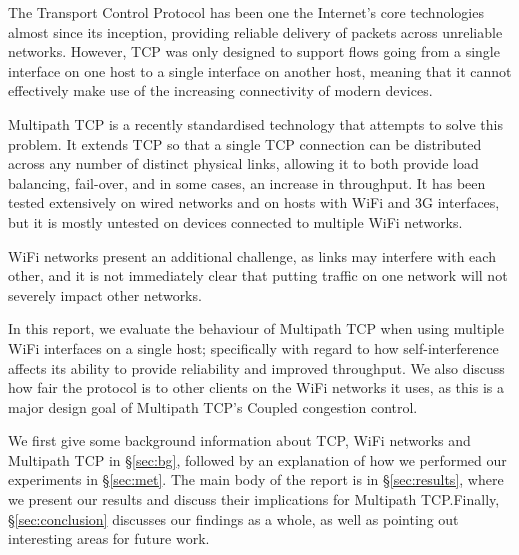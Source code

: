 The Transport Control Protocol has been one the Internet's core technologies almost since its inception, providing reliable delivery of packets across unreliable
networks. However, TCP was only designed to support flows going from a single
interface on one host to a single interface on another host, meaning that it cannot
effectively make use of the increasing connectivity of modern devices.

Multipath TCP is a recently standardised technology that attempts to solve this
problem. It extends TCP so that a single TCP connection can be distributed
across any number of distinct physical links, allowing it to both provide load
balancing, fail-over, and in some cases, an increase in throughput. It has been
tested extensively on wired networks and on hosts with WiFi and 3G interfaces,
but it is mostly untested on devices connected to multiple WiFi networks.

WiFi networks present an additional challenge, as links may interfere with each
other, and it is not immediately clear that putting traffic on one network will
not severely impact other networks.

In this report, we evaluate the behaviour of Multipath TCP when using multiple
WiFi interfaces on a single host; specifically with regard to how
self-interference affects its ability to provide reliability and improved
throughput. We also discuss how fair the protocol is to other clients on the WiFi
networks it uses, as this is a major design goal of Multipath TCP's Coupled
congestion control.

We first give some background information about TCP, WiFi networks and Multipath
TCP in \S\ref{sec:bg}, followed by an explanation of how we performed our
experiments in \S\ref{sec:met}. The main body of the report is in
\S\ref{sec:results}, where we present our results and discuss their implications
for Multipath TCP.\@ Finally, \S\ref{sec:conclusion} discusses our findings as a
whole, as well as pointing out interesting areas for future work.
